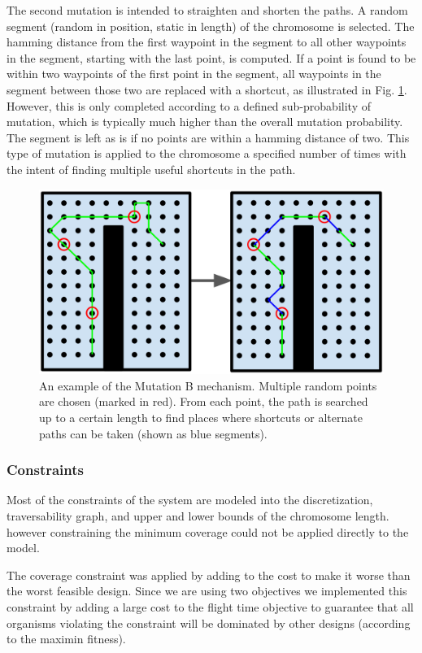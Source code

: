 \documentclass[letterpaper, 10 pt, conference]{ieeeconf}  %
\begin{document}
The second mutation is intended to straighten and shorten the paths. A random segment (random in position, static in length) of the chromosome is selected. The hamming distance from the first waypoint in the segment to all other waypoints in the segment, starting with the last point, is computed. If a point is found to be within two waypoints of the first point in the segment, all waypoints in the segment between those two are replaced with a shortcut, as illustrated in Fig. \ref{fig:muterpolation}. However, this is only completed according to a defined sub-probability of mutation, which is typically much higher than the overall mutation probability. The segment is left as is if no points are within a hamming distance of two. This type of mutation is applied to the chromosome a specified number of times with the intent of finding multiple useful shortcuts in the path.

\begin{figure}
\centering
\includegraphics[width=0.8\linewidth]{figures/muterpolation.png}
\caption{An example of the Mutation B mechanism. Multiple random points are chosen (marked in red). From each point, the path is searched up to a certain length to find places where shortcuts or alternate paths can be taken (shown as blue segments).}
\label{fig:muterpolation}
\end{figure}

\subsubsection{Constraints}

Most of the constraints of the system are modeled into the discretization, traversability graph, and upper and lower bounds of the chromosome length. however constraining the minimum coverage could not be applied directly to the model.

The coverage constraint was applied by adding to the cost to make it worse than the worst feasible design. Since we are using two objectives we implemented this constraint by adding a large cost to the flight time objective to guarantee that all organisms violating the constraint will be dominated by other designs (according to the maximin fitness).
\end{document}
